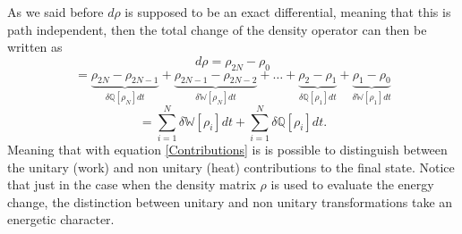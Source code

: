 As we said before $d\rho$ is supposed to be an exact differential, meaning that this is path independent, then the total change of the density operator can then be written as
\[
d\rho=\rho_{2N}-\rho_{0}
\]
\[
=\underbrace{\rho_{2N}-\rho_{2N-1}}_{\delta\mathbb{Q}[\rho_{N}]dt}+\underbrace{\rho_{2N-1}-\rho_{2N-2}}_{\delta\mathbb{W}[\rho_{N}]dt}+\ldots+\underbrace{\rho_{2}-\rho_{1}}_{\delta\mathbb{Q}[\rho_1]dt}+\underbrace{\rho_{1}-\rho_{0}}_{\delta\mathbb{W}[\rho_{1}]dt}
\]
\begin{equation}
=\sum_{i=1}^{N}\delta\mathbb{W}[\rho_{i}]dt+\sum_{i=1}^{N}\delta\mathbb{Q}[\rho_{i}]dt.
\label{Contributions}
\end{equation}
Meaning that with equation \eqref{Contributions} is is possible to distinguish between the unitary (work) and non unitary (heat) contributions to the final state. Notice that just in the case when the density matrix $\rho$ is used to evaluate the energy change, the distinction between unitary and non unitary transformations take an energetic character.
